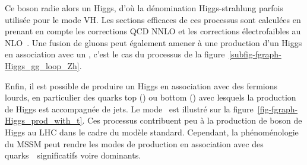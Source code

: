 Ce boson radie alors un Higgs, d'où la dénomination \og Higgs-strahlung \fg{} parfois utilisée pour le mode VH.
Les sections efficaces de ces processus sont calculées en prenant en compte les corrections QCD NNLO et les corrections électrofaibles au NLO~\cite{Higgs_xsec_book_4}.
Une fusion de gluons peut également amener à une production d'un Higgs en association avec un \Zboson, c'est le cas du processus de la figure~\ref{subfig-fgraph-Higgs_gg_loop_Zh}.
\par Enfin, il est possible de produire un Higgs en association avec des fermions lourds, en particulier des quarks top (\quarkt\antiquarkt\higgs) ou bottom (\quarkb\antiquarkb\higgs) avec lesquels la production de Higgs est accompagnée de jets.
Le mode \quarkt\antiquarkt\higgs\ est illustré sur la figure~\ref{fig-fgraph-Higgs_prod_with_t}.
Ces processus contribuent peu à la production de boson de Higgs au LHC dans le cadre du modèle standard.
Cependant, la phénoménologie du MSSM peut rendre les modes de production en association avec des quarks~\quarkb\ significatifs voire dominants.
